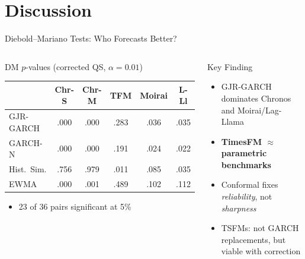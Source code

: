 \documentclass[9pt, aspectratio=169, t]{beamer}
\begin{document}
\section{Discussion}
\begin{frame}{Diebold--Mariano Tests: Who Forecasts Better?}
	\vspace{-0.2cm}
	{\footnotesize
	\begin{columns}[T]
		\begin{block}{DM $p$-values (corrected QS, $\alpha = 0.01$)}
		{\scriptsize
		\begin{tabular}{@{}lccccc@{}}
		\toprule
		& Chr-S & Chr-M & TFM & Moirai & L-Ll \\
		\midrule
		GJR-GARCH   & .000 & .000 & .283 & .036 & .035 \\
		GARCH-N     & .000 & .000 & .191 & .024 & .022 \\
		Hist.\ Sim. & .756 & .979 & .011 & .085 & .035 \\
		EWMA        & .000 & .001 & .489 & .102 & .112 \\
		\bottomrule
		\end{tabular}
		}
		\vspace{1mm}
		\begin{itemize}\setlength{\itemsep}{0pt}
			\item 23 of 36 pairs significant at 5\%
		\end{itemize}
		\end{block}

		\begin{exampleblock}{Key Finding}
		\begin{itemize}\setlength{\itemsep}{3pt}
			\item GJR-GARCH dominates Chronos and Moirai/Lag-Llama
			\item \textbf{TimesFM $\approx$ parametric benchmarks}
			\item Conformal fixes \emph{reliability}, not \emph{sharpness}
			\item TSFMs: not GARCH replacements, but viable with correction
		\end{itemize}
		\end{exampleblock}
	\end{columns}
	}
\end{frame}
\end{document}
